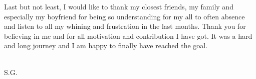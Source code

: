 Last but not least, I would like to thank my closest friends, my family and especially my boyfriend for being so understanding for my all to often absence and listen to all my whining and frustration in the last months. Thank you for believing in me and for all motivation and contribution I have got. It was a hard and long journey and I am happy to finally have reached the goal. \\[2cm]


\begin{flushright}

\thesisdate \\[1pc]
S.G.\\[1pc]
\end{flushright}
